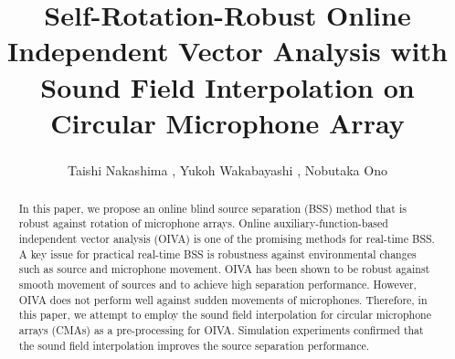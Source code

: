 \documentclass[twocolumn,9pt,dvipdfmx]{article}
\title{Self-Rotation-Robust Online Independent Vector Analysis with\\Sound Field Interpolation on Circular Microphone Array}
\author{%
  Taishi Nakashima \textsuperscript{\textdagger},
  Yukoh Wakabayashi \textsuperscript{\textdaggerdbl},
  Nobutaka Ono \textsuperscript{\textdagger}
}
\begin{document}
\maketitle

\begin{abstract}
  In this paper, we propose an online blind source separation (BSS) method that is robust against rotation of microphone arrays.
  Online auxiliary-function-based independent vector analysis (OIVA) is one of the promising methods for real-time BSS.
  A key issue for practical real-time BSS is robustness against environmental changes such as source and microphone movement.
  OIVA has been shown to be robust against smooth movement of sources and to achieve high separation performance.
  However, OIVA does not perform well against sudden movements of microphones.
  Therefore, in this paper, we attempt to employ the sound field interpolation for circular microphone arrays (CMAs) as a pre-processing for OIVA.
  Simulation experiments confirmed that the sound field interpolation improves the source separation performance.
\end{abstract}
\end{document}
